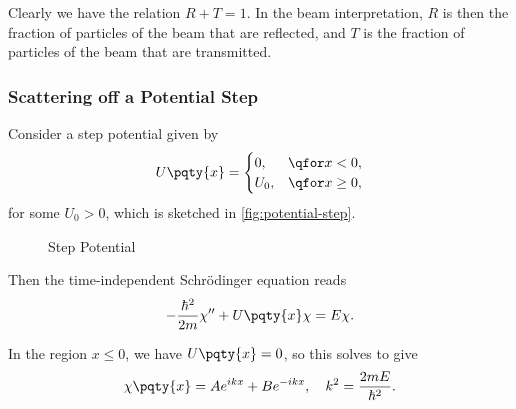 Clearly we have the relation \(R + T = 1\). In the beam interpretation, \(R\) is then the fraction of particles of the beam that are reflected, and \(T\) is the fraction of particles of the beam that are transmitted.

\subsubsection{Scattering off a Potential Step}

Consider a step potential given by
\begin{equation}
    U\pqty{x} = \begin{cases}
        0, & \qfor x < 0, \\
        U_0, & \qfor x \geq 0,
    \end{cases}
\end{equation}
for some \(U_0 > 0\), which is sketched in \autoref{fig:potential-step}.

\begin{figure}[ht]
    \centering
    \caption{Step Potential}
    \label{fig:potential-step}%
\end{figure}

Then the time-independent Schr\"{o}dinger equation reads
\begin{equation}
    - \frac{\hbar^2}{2 m} \chi'' + U\pqty{x} \chi = E \chi.
\end{equation}

In the region \(x \leq 0\), we have \(U\pqty{x} = 0\), so this solves to give
\begin{equation}
    \chi\pqty{x} = A e^{i k x} + B e^{- i k x}, \quad k^2 = \frac{2 m E}{\hbar^2}.
\end{equation}

